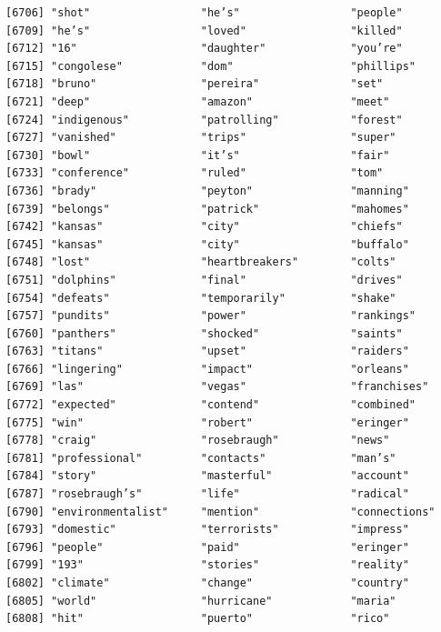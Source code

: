\documentclass[
  letterpaper,
  DIV=11,
  numbers=noendperiod]{scrartcl}
\begin{document}
\begin{verbatim}
[6706] "shot"                 "he’s"                 "people"              
[6709] "he’s"                 "loved"                "killed"              
[6712] "16"                   "daughter"             "you’re"              
[6715] "congolese"            "dom"                  "phillips"            
[6718] "bruno"                "pereira"              "set"                 
[6721] "deep"                 "amazon"               "meet"                
[6724] "indigenous"           "patrolling"           "forest"              
[6727] "vanished"             "trips"                "super"               
[6730] "bowl"                 "it’s"                 "fair"                
[6733] "conference"           "ruled"                "tom"                 
[6736] "brady"                "peyton"               "manning"             
[6739] "belongs"              "patrick"              "mahomes"             
[6742] "kansas"               "city"                 "chiefs"              
[6745] "kansas"               "city"                 "buffalo"             
[6748] "lost"                 "heartbreakers"        "colts"               
[6751] "dolphins"             "final"                "drives"              
[6754] "defeats"              "temporarily"          "shake"               
[6757] "pundits"              "power"                "rankings"            
[6760] "panthers"             "shocked"              "saints"              
[6763] "titans"               "upset"                "raiders"             
[6766] "lingering"            "impact"               "orleans"             
[6769] "las"                  "vegas"                "franchises"          
[6772] "expected"             "contend"              "combined"            
[6775] "win"                  "robert"               "eringer"             
[6778] "craig"                "rosebraugh"           "news"                
[6781] "professional"         "contacts"             "man’s"               
[6784] "story"                "masterful"            "account"             
[6787] "rosebraugh’s"         "life"                 "radical"             
[6790] "environmentalist"     "mention"              "connections"         
[6793] "domestic"             "terrorists"           "impress"             
[6796] "people"               "paid"                 "eringer"             
[6799] "193"                  "stories"              "reality"             
[6802] "climate"              "change"               "country"             
[6805] "world"                "hurricane"            "maria"               
[6808] "hit"                  "puerto"               "rico"                

\end{verbatim}
\end{document}
